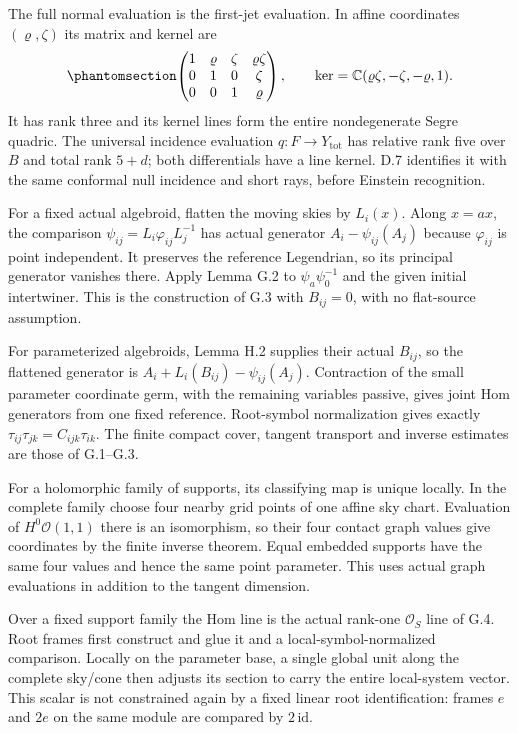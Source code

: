 \documentclass[
  english,
  11pt,
  reqno]{amsart}
\begin{document}
The full normal evaluation is the first-jet evaluation. In affine
coordinates \((\varrho,\zeta)\) its matrix and kernel are
\begin{equation}\protect\phantomsection\label{eq:gg-independent-op-jet-evaluation}{
 \begin{pmatrix}
 1&\varrho&\zeta&\varrho\zeta\\
 0&1&0&\zeta\\
 0&0&1&\varrho
 \end{pmatrix},\qquad
 \ker=\mathbb C(\varrho\zeta,-\zeta,-\varrho,1).
}\end{equation} It has rank three and its kernel lines form the entire
nondegenerate Segre quadric. The universal incidence evaluation
\(q:F\to Y_{\mathrm{tot}}\) has relative rank five over \(B\) and total
rank \(5+d\); both differentials have a line kernel. D.7 identifies it
with the same conformal null incidence and short rays, before Einstein
recognition.

For a fixed actual algebroid, flatten the moving skies by \(L_i(x)\).
Along \(x=ax\), the comparison \(\psi_{ij}=L_i\varphi_{ij}L_j^{-1}\) has
actual generator \(A_i-\psi_{ij}(A_j)\) because \(\varphi_{ij}\) is
point independent. It preserves the reference Legendrian, so its
principal generator vanishes there. Apply Lemma G.2 to
\(\psi_a\psi_0^{-1}\) and the given initial intertwiner. This is the
construction of G.3 with \(B_{ij}=0\), with no flat-source assumption.

For parameterized algebroids, Lemma H.2 supplies their actual
\(B_{ij}\), so the flattened generator is
\(A_i+L_i(B_{ij})-\psi_{ij}(A_j)\). Contraction of the small parameter
coordinate germ, with the remaining variables passive, gives joint Hom
generators from one fixed reference. Root-symbol normalization gives
exactly \(\tau_{ij}\tau_{jk}=C_{ijk}\tau_{ik}\). The finite compact
cover, tangent transport and inverse estimates are those of G.1--G.3.

For a holomorphic family of supports, its classifying map is unique
locally. In the complete family choose four nearby grid points of one
affine sky chart. Evaluation of \(H^0\mathcal O(1,1)\) there is an
isomorphism, so their four contact graph values give coordinates by the
finite inverse theorem. Equal embedded supports have the same four
values and hence the same point parameter. This uses actual graph
evaluations in addition to the tangent dimension.

Over a fixed support family the Hom line is the actual rank-one
\(\mathcal O_S\) line of G.4. Root frames first construct and glue it
and a local-symbol-normalized comparison. Locally on the parameter base,
a single global unit along the complete sky/cone then adjusts its
section to carry the entire local-system vector. This scalar is not
constrained again by a fixed linear root identification: frames \(e\)
and \(2e\) on the same module are compared by \(2\,\mathrm{id}\).
\end{document}
